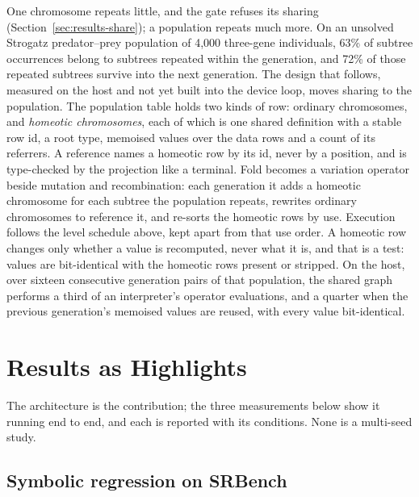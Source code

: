 \documentclass[sigconf,nonacm]{acmart}
\begin{document}
One chromosome repeats little, and the gate refuses its sharing
(Section~\ref{sec:results-share}); a population repeats much more. On an
unsolved Strogatz predator--prey population of 4{,}000 three-gene individuals,
63\% of subtree occurrences belong to subtrees repeated within the generation,
and 72\% of those repeated subtrees survive into the next generation. The design
that follows, measured on the host and not yet built into the device loop, moves
sharing to the population. The population table holds two kinds of row:
ordinary chromosomes, and \emph{homeotic chromosomes}, each of which is one
shared definition with a stable row id, a root type, memoised values over the
data rows and a count of its referrers. A reference names a homeotic row by its
id, never by a position, and is type-checked by the projection like a terminal.
Fold becomes a variation operator beside mutation and recombination: each
generation it adds a homeotic chromosome for each subtree the population repeats,
rewrites ordinary chromosomes to reference it, and re-sorts the homeotic rows by
use. Execution follows the level schedule above, kept apart from that use order.
A homeotic row changes only whether a value is recomputed, never what it is, and
that is a test: values are bit-identical with the homeotic rows present or
stripped. On the host, over sixteen consecutive generation pairs of that
population, the shared graph performs a third of an interpreter's operator
evaluations, and a quarter when the previous generation's memoised values are
reused, with every value bit-identical.

\section{Results as Highlights}
\label{sec:results}

The architecture is the contribution; the three measurements below show it
running end to end, and each is reported with its conditions. None is a
multi-seed study.

\subsection{Symbolic regression on SRBench}
\label{sec:results-sr}
\end{document}
